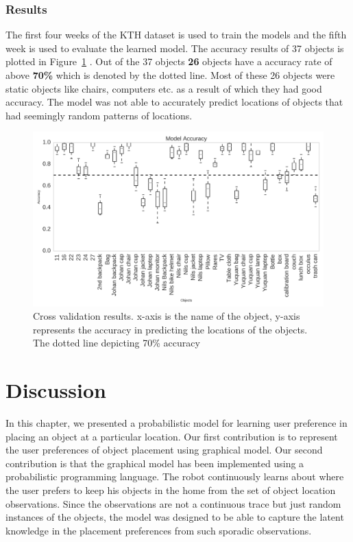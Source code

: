 \subsubsection*{Results}

The first four weeks of the KTH dataset is used to train the models and the fifth week is used to evaluate the learned model. The accuracy results of 37 objects is plotted in Figure~\ref{fig:kth_object_evaluation} . 
Out of the 37 objects \textbf{26} objects have a accuracy rate of above \textbf{70\%} which is denoted by the dotted line. Most of these 26 objects were static objects like chairs, computers etc. as a result of which they had good accuracy. The model was not able to accurately predict locations of objects that had seemingly random patterns of locations.
\begin{figure}[htp]
\centering
\includegraphics[width=\textwidth]{images/evaluation_kth.png}
\caption[Cross validation results]{Cross validation results. x-axis is the name of the object, y-axis represents the accuracy in predicting the locations of the objects. The dotted line depicting 70\% accuracy}
\label{fig:kth_object_evaluation}
\end{figure}

\FloatBarrier
\section{Discussion}
In this chapter, we presented a probabilistic model for learning user preference in placing an object at a particular location. 
Our first contribution is to represent the user preferences of object placement using graphical model. 
Our second contribution is that the graphical model has been implemented using a probabilistic programming language. 
The robot continuously learns about where the user prefers to keep his objects in the home from the set of object location observations. 
Since the observations are not a continuous trace but just random instances of the objects, the model was designed to be able to capture the latent knowledge in the placement preferences from such sporadic observations.

